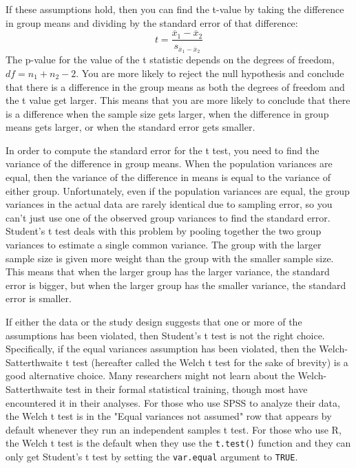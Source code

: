 \documentclass[man,a4paper,noextraspace,apacite]{apa6}
\begin{document}
If these assumptions hold, then you can find the t-value by taking the difference in group means and dividing by the standard error of that difference:   
    \begin{equation}
    t = \frac{\overline{x}_1-\overline{x}_2}{s_{\overline{x}_1-\overline{x}_2}}
    \end{equation}
    The p-value for the value of the t statistic depends on the degrees of freedom, $df=n_1+n_2-2$. You are more likely to reject the null hypothesis and conclude that there is a difference in the group means as both the degrees of freedom and the t value get larger. This means that you are more likely to conclude that there is a difference when the sample size gets larger, when the difference in group means gets larger, or when the standard error gets smaller. 
    
    In order to compute the standard error for the t test, you need to find the variance of the difference in group means. When the population variances are equal, then the variance of the difference in means is equal to the variance of either group. Unfortunately, even if the population variances are equal, the group variances in the actual data are rarely identical due to sampling error, so you can't just use one of the observed group variances to find the standard error. Student's t test deals with this problem by pooling together the two group variances to estimate a single common variance. The group with the larger sample size is given more weight than the group with the smaller sample size. This means that when the larger group has the larger variance, the standard error is bigger, but when the larger group has the smaller variance, the standard error is smaller.

    If either the data or the study design suggests that one or more of the assumptions has been violated, then Student's t test is not the right choice. Specifically, if the equal variances assumption has been violated, then the Welch-Satterthwaite t test (hereafter called the Welch t test for the sake of brevity) is a good alternative choice. Many researchers might not learn about the Welch-Satterthwaite test in their formal statistical training, though most have encountered it in their analyses. For those who use SPSS to analyze their data, the Welch t test is in the "Equal variances not assumed" row that appears by default whenever they run an independent samples t test. For those who use R, the Welch t test is the default when they use the \texttt{t.test()} function and they can only get Student's t test by setting the \texttt{var.equal} argument to \texttt{TRUE}.
    
\end{document}
